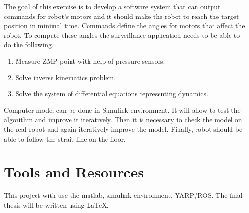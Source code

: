 \documentclass[11pt,a4paper]{article}
\begin{document}
The goal of this exercise is to develop a software system that can output commands for robot's motors and it should make the robot to reach the target position in minimal time. Commands define the angles for motors that affect the robot. To compute these angles the surveillance application needs to be able to do the following.
\begin{enumerate}
\item Measure ZMP point with help of pressure sensors.
\item Solve inverse kinematics problem.
\item Solve the system of differential equations representing dynamics.
\end{enumerate}
Computer model can be done in Simulink environment. It will allow to test the algorithm and improve it iteratively. Then it is necessary to check the model on the real robot and again iteratively improve the model. Finally, robot should be able to follow the strait line on the floor. 

\section{Tools and Resources}

This project with use the matlab, simulink environment, YARP/ROS. The final thesis will be written using \LaTeX \cite{Lamport86}.
 
\end{document}
